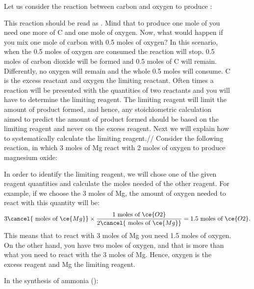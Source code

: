 \documentclass[main.tex]{subfiles}
\begin{document}
\begin{description}
\item[] 
Let us consider the reaction between carbon and oxygen to produce :
\begin{center} \end{center}
This reaction should be read as . Mind that to produce one mole of  you need one more of C and one mole of oxygen. Now, what would happen if you mix one mole of carbon with 0.5 moles of oxygen? In this scenario, when the 0.5 moles of oxygen are consumed the reaction will stop. 0.5 moles of carbon dioxide will be formed and 0.5 moles of C will remain. Differently, no oxygen will remain and the whole 0.5 moles will consume. C is the excess reactant and oxygen the limiting reactant. 
Often times a reaction will be presented with the quantities of two reactants and you will have to determine the limiting reagent. The limiting reagent will limit the amount of product formed, and hence, any stoichiometric calculation aimed to predict the amount of product formed should be based on the limiting reagent and never on the excess reagent.  Next we will explain how to systematically calculate the limiting reagent.//
Consider the following reaction, in which 3 moles of Mg react with 2 moles of oxygen to produce magnesium oxide:
\begin{center}  \end{center}
In order to identify the limiting reagent, we will chose one of the given reagent quantities and calculate the moles needed of the other reagent. For example, if we choose the 3 moles of Mg, the amount of oxygen needed to react with this quantity will be:
\begin{equation*}
3\cancel{\text{ moles of }\ce{Mg}} \times \dfrac{\text{1 moles of }\ce{O2}}{2\cancel{\text{ moles of }\ce{Mg}}}=1.5\text{ moles of }\ce{O2}.
\end{equation*}
This means that to react with 3 moles of Mg you need 1.5 moles of oxygen. On the other hand, you have two moles of oxygen, and that is more than what you need to react with the 3 moles of Mg. Hence, oxygen is the excess reagent and Mg the limiting reagent.
\begin{example} %
In the synthesis of ammonia ():
\begin{center}  \end{center}

\end{example}
\end{description}
\end{document}
